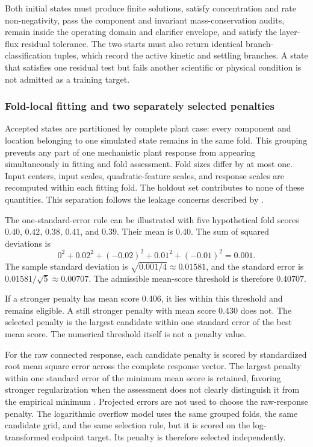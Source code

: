 Both initial states must produce finite solutions, satisfy concentration and rate non-negativity, pass the component and invariant mass-conservation audits, remain inside the operating domain and clarifier envelope, and satisfy the layer-flux residual tolerance. The two starts must also return identical branch-classification tuples, which record the active kinetic and settling branches. A state that satisfies one residual test but fails another scientific or physical condition is not admitted as a training target.

\subsubsection{Fold-local fitting and two separately selected penalties}

Accepted states are partitioned by complete plant case: every component and location belonging to one simulated state remains in the same fold. This grouping prevents any part of one mechanistic plant response from appearing simultaneously in fitting and fold assessment. Fold sizes differ by at most one. Input centers, input scales, quadratic-feature scales, and response scales are recomputed within each fitting fold. The holdout set contributes to none of these quantities. This separation follows the leakage concerns described by \citet{Kaufman2012}.

The one-standard-error rule can be illustrated with five hypothetical fold scores $0.40$, $0.42$, $0.38$, $0.41$, and $0.39$. Their mean is 0.40. The sum of squared deviations is
\[
0^2+0.02^2+(-0.02)^2+0.01^2+(-0.01)^2=0.001.
\]
The sample standard deviation is $\sqrt{0.001/4}\approx0.01581$, and the standard error is $0.01581/\sqrt5\approx0.00707$. The admissible mean-score threshold is therefore $0.40707$.

If a stronger penalty has mean score 0.406, it lies within this threshold and remains eligible. A still stronger penalty with mean score 0.430 does not. The selected penalty is the largest candidate within one standard error of the best mean score. The numerical threshold itself is not a penalty value.

For the raw connected response, each candidate penalty is scored by standardized root mean square error across the complete response vector. The largest penalty within one standard error of the minimum mean score is retained, favoring stronger regularization when the assessment does not clearly distinguish it from the empirical minimum \citep{Hastie2009}. Projected errors are not used to choose the raw-response penalty. The logarithmic overflow model uses the same grouped folds, the same candidate grid, and the same selection rule, but it is scored on the log-transformed endpoint target. Its penalty is therefore selected independently.

